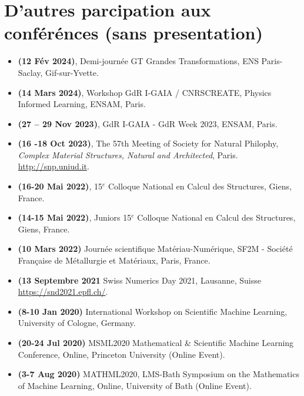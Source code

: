 \documentclass[french]{article}
\begin{document}
\section*{D'autres parcipation aux conférénces (sans presentation)}
\begin{itemize}
\item \textbf{(12 Fév 2024)}, Demi-journée GT Grandes Transformations, ENS Paris-Saclay, Gif-sur-Yvette.  
\item \textbf{(14 Mars 2024)}, Workshop GdR I-GAIA / CNRS\@ CREATE, Physics Informed Learning, ENSAM, Paris.
\item \textbf{(27 – 29 Nov 2023)}, GdR I-GAIA - GdR Week 2023, ENSAM, Paris. 
\item \textbf{(16 -18 Oct 2023)}, The 57th Meeting of Society for Natural Philophy, \textit{Complex Material Structures, Natural and Architected}, Paris. \url{http://snp.uniud.it}.
\item \textbf{(16-20 Mai 2022)}, 15$^{e}$ Colloque National en Calcul des Structures, Giens, France.
\item \textbf{(14-15 Mai 2022)}, Juniors 15$^{e}$ Colloque National en Calcul des Structures, Giens, France.
\item \textbf{(10 Mars 2022)} Journée scientifique Matériau-Numérique, SF2M - Société  Française de Métallurgie et Matériaux, Paris, France.
\item \textbf{(13 Septembre 2021} Swiss Numerics Day 2021, Lausanne, Suisse  \url{https://snd2021.epfl.ch/}. 
\item \textbf{(8-10 Jan 2020)} International Workshop on Scientific Machine Learning, University of Cologne, Germany.
\item \textbf{(20-24 Jul 2020)} MSML2020 Mathematical \& Scientific Machine Learning Conference, Online, Princeton University (Online Event).
\item \textbf{(3-7 Aug 2020)} MATHML2020,  LMS-Bath Symposium on the Mathematics of Machine Learning, Online, University of Bath (Online Event).
\end{itemize}
\end{document}

